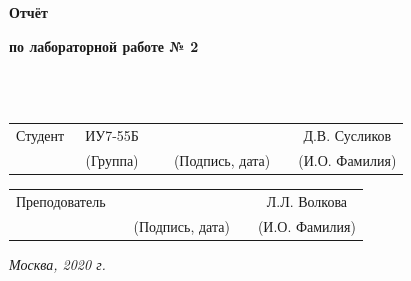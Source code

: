 \documentclass[12pt]{report}
\begin{document}
	
	\begin{center}
		\vspace{3cm}
		{\bf\huge Отчёт\par}
		{\bf\Large по лабораторной работе № 2\par}
		\vspace{0.5cm}
	\end{center}
	
	
	\noindent
	\\
	
	\noindent
	\\
	
	\vspace{1.5cm}
	\noindent
	\begin{tabular}{l c c c c c}
		Студент      & ~ИУ7-55Б~               & \hspace{3.5cm} & \hspace{3.5cm}                 & &  Д.В. Сусликов \\\cline{2-2}\cline{4-4} \cline{6-6} 
		\hspace{3cm} & {\footnotesize(Группа)} &                & {\footnotesize(Подпись, дата)} & & {\footnotesize(И.О. Фамилия)}
	\end{tabular}
	
	\vspace{1cm}
	
	\noindent
	\begin{tabular}{l c c c c}
		Преподователь & \hspace{6cm}   & \hspace{3.5cm}                 & & Л.Л. Волкова \\\cline{3-3} \cline{5-5} 
		\hspace{3cm}  &                & {\footnotesize(Подпись, дата)} & & {\footnotesize(И.О. Фамилия)}
	\end{tabular}
	
	\begin{center}	
		\vfill
		\large \textit {Москва, 2020 г.}
	\end{center}
	
	\thispagestyle {empty}
	\pagebreak
	
	\tableofcontents
	\onehalfspacing
	
	\newpage
\end{document}
